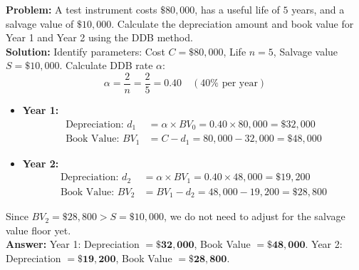 \documentclass[12pt,a4paper]{article}
\begin{document}
\begin{tcolorbox}[examplebox, title={Example 1: Double Declining Balance (DDB)}]
\textbf{Problem:} A test instrument costs $\$80,000$, has a useful life of $5$ years, and a salvage value of $\$10,000$. Calculate the depreciation amount and book value for Year 1 and Year 2 using the DDB method.\\[4pt]
\textbf{Solution:}
Identify parameters: Cost $C = \$80,000$, Life $n = 5$, Salvage value $S = \$10,000$.
Calculate DDB rate $\alpha$:
\begin{equation*}
  \alpha = \frac{2}{n} = \frac{2}{5} = 0.40 \quad (40\% \text{ per year})
\end{equation*}
\begin{itemize}[leftmargin=*, itemsep=8pt]
  \item \textbf{Year 1:}
    \begin{align*}
      \text{Depreciation: } d_1 &= \alpha \times BV_0 = 0.40 \times 80,000 = \$32,000 \\
      \text{Book Value: } BV_1 &= C - d_1 = 80,000 - 32,000 = \$48,000
    \end{align*}
  \item \textbf{Year 2:}
    \begin{align*}
      \text{Depreciation: } d_2 &= \alpha \times BV_1 = 0.40 \times 48,000 = \$19,200 \\
      \text{Book Value: } BV_2 &= BV_1 - d_2 = 48,000 - 19,200 = \$28,800
    \end{align*}
\end{itemize}
Since $BV_2 = \$28,800 > S = \$10,000$, we do not need to adjust for the salvage value floor yet.\\[4pt]
\textbf{Answer:} Year 1: Depreciation $= \mathbf{\$32,000}$, Book Value $= \mathbf{\$48,000}$. Year 2: Depreciation $= \mathbf{\$19,200}$, Book Value $= \mathbf{\$28,800}$.
\end{tcolorbox}
\end{document}
